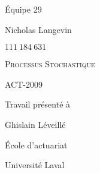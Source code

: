 
% 




\makeatletter
\begin{titlepage}
\centering \large
\begin{flushright}
Équipe 29
\end{flushright}

Nicholas Langevin
\par
$111 \ 184 \ 631$
\vspace{0.5cm}




\vfill


{
\scshape
Processus Stochastique
\par
ACT-2009
}
\vfill


{
\bfseries \Large
\@title
}
\vfill


Travail présenté à
\par
Ghislain Léveillé
\vfill

École d'actuariat
\par
Université Laval
\par 
\@date
\end{titlepage}
\makeatother
